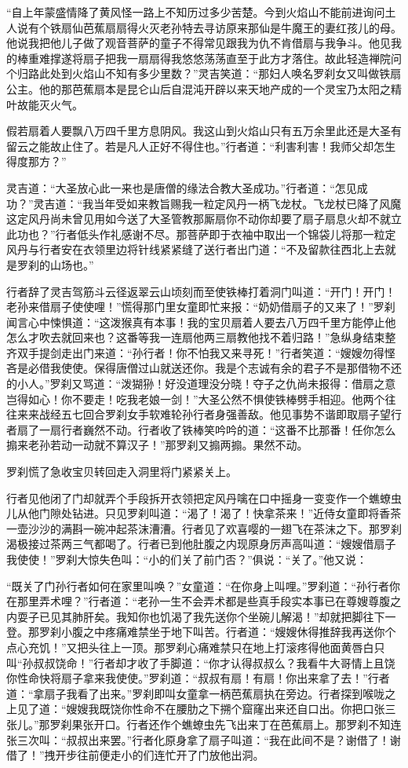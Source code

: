 \documentclass[12pt,UTF8]{ctexbook}
\begin{document}
“自上年蒙盛情降了黄风怪一路上不知历过多少苦楚。今到火焰山不能前进询问土人说有个铁扇仙芭蕉扇扇得火灭老孙特去寻访原来那仙是牛魔王的妻红孩儿的母。他说我把他儿子做了观音菩萨的童子不得常见跟我为仇不肯借扇与我争斗。他见我的棒重难撑遂将扇子把我一扇扇得我悠悠荡荡直至于此方才落住。故此轻造禅院问个归路此处到火焰山不知有多少里数？”灵吉笑道：“那妇人唤名罗刹女又叫做铁扇公主。他的那芭蕉扇本是昆仑山后自混沌开辟以来天地产成的一个灵宝乃太阳之精叶故能灭火气。

假若扇着人要飘八万四千里方息阴风。我这山到火焰山只有五万余里此还是大圣有留云之能故止住了。若是凡人正好不得住也。”行者道：“利害利害！我师父却怎生得度那方？”

灵吉道：“大圣放心此一来也是唐僧的缘法合教大圣成功。”行者道：“怎见成功？”灵吉道：“我当年受如来教旨赐我一粒定风丹一柄飞龙杖。飞龙杖已降了风魔这定风丹尚未曾见用如今送了大圣管教那厮扇你不动你却要了扇子扇息火却不就立此功也？”行者低头作礼感谢不尽。那菩萨即于衣袖中取出一个锦袋儿将那一粒定风丹与行者安在衣领里边将针线紧紧缝了送行者出门道：“不及留款往西北上去就是罗刹的山场也。”

行者辞了灵吉驾筋斗云径返翠云山顷刻而至使铁棒打着洞门叫道：“开门！开门！老孙来借扇子使使哩！”慌得那门里女童即忙来报：“奶奶借扇子的又来了！”罗刹闻言心中悚惧道：“这泼猴真有本事！我的宝贝扇着人要去八万四千里方能停止他怎么才吹去就回来也？这番等我一连扇他两三扇教他找不着归路！”急纵身结束整齐双手提剑走出门来道：“孙行者！你不怕我又来寻死！”行者笑道：“嫂嫂勿得悭吝是必借我使使。保得唐僧过山就送还你。我是个志诚有余的君子不是那借物不还的小人。”罗刹又骂道：“泼猢狲！好没道理没分晓！夺子之仇尚未报得：借扇之意岂得如心！你不要走！吃我老娘一剑！”大圣公然不惧使铁棒劈手相迎。他两个往往来来战经五七回合罗刹女手软难轮孙行者身强善敌。他见事势不谐即取扇子望行者扇了一扇行者巍然不动。行者收了铁棒笑吟吟的道：“这番不比那番！任你怎么搧来老孙若动一动就不算汉子！”那罗刹又搧两搧。果然不动。

罗刹慌了急收宝贝转回走入洞里将门紧紧关上。

行者见他闭了门却就弄个手段拆开衣领把定风丹噙在口中摇身一变变作一个蟭蟟虫儿从他门隙处钻进。只见罗刹叫道：“渴了！渴了！快拿茶来！”近侍女童即将香茶一壶沙沙的满斟一碗冲起茶沫漕漕。行者见了欢喜嘤的一翅飞在茶沫之下。那罗刹渴极接过茶两三气都喝了。行者已到他肚腹之内现原身厉声高叫道：“嫂嫂借扇子我使使！”罗刹大惊失色叫：“小的们关了前门否？”俱说：“关了。”他又说：

“既关了门孙行者如何在家里叫唤？”女童道：“在你身上叫哩。”罗刹道：“孙行者你在那里弄术哩？”行者道：“老孙一生不会弄术都是些真手段实本事已在尊嫂尊腹之内耍子已见其肺肝矣。我知你也饥渴了我先送你个坐碗儿解渴！”却就把脚往下一登。那罗刹小腹之中疼痛难禁坐于地下叫苦。行者道：“嫂嫂休得推辞我再送你个点心充饥！”又把头往上一顶。那罗刹心痛难禁只在地上打滚疼得他面黄唇白只叫“孙叔叔饶命！”行者却才收了手脚道：“你才认得叔叔么？我看牛大哥情上且饶你性命快将扇子拿来我使使。”罗刹道：“叔叔有扇！有扇！你出来拿了去！”行者道：“拿扇子我看了出来。”罗刹即叫女童拿一柄芭蕉扇执在旁边。行者探到喉咙之上见了道：“嫂嫂我既饶你性命不在腰肋之下搠个窟窿出来还自口出。你把口张三张儿。”那罗刹果张开口。行者还作个蟭蟟虫先飞出来丁在芭蕉扇上。那罗刹不知连张三次叫：“叔叔出来罢。”行者化原身拿了扇子叫道：“我在此间不是？谢借了！谢借了！”拽开步往前便走小的们连忙开了门放他出洞。
\end{document}
